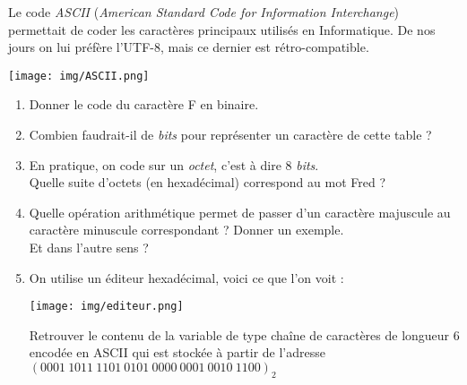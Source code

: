 \documentclass[a4paper,12pt,french]{book}
\begin{document}
\begin{exercice}[]
	Le code \textsl{ASCII} (\textit{American Standard Code for Information Interchange}) permettait de coder les caractères principaux utilisés en Informatique. 
	De nos jours on lui préfère l'UTF-8, mais ce dernier est rétro-compatible.
	\begin{center}
		\texttt{[image: img/ASCII.png]}	
	\end{center}
	\begin{enumerate}[\bfseries 1.]
		\item 	Donner le code du caractère \og F\fg{} en binaire.
		\item 	Combien faudrait-il de \textit{bits} pour représenter un caractère de cette table ?
		\item 	En pratique, on code sur un \textit{octet}, c'est à dire 8 \textit{bits}.\\
		Quelle suite d'octets (en hexadécimal) correspond au mot \og Fred\fg{} ?
		\item 	Quelle opération arithmétique permet de passer d'un caractère majuscule au caractère minuscule correspondant ? Donner un exemple.\\
		Et dans l'autre sens ?
		\newpage
		\item  	On utilise un éditeur hexadécimal, voici ce que l'on voit :
		\begin{center}
			\texttt{[image: img/editeur.png]}
		\end{center}
		
		Retrouver le contenu de la variable de type chaîne de caractères de longueur 6 encodée en \textsc{ASCII} qui est stockée à partir de l'adresse $(0001\ 1011\ 1101\ 0101\ 0000\ 0001\ 0010\ 1100)_2$	
	\end{enumerate}
\end{exercice}
\creativecommonsheader
\end{document}
